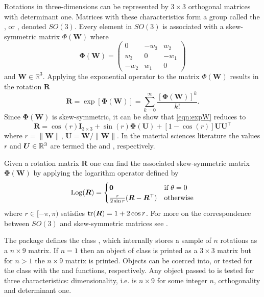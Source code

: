 Rotations in three-dimensions can be represented by $3\times3$ orthogonal matrices with determinant one.  Matrices with these characteristics form a group called the , or , denoted $SO(3)$.  Every element in $SO(3)$ is associated with a skew-symmetric matrix $\Phi(\bm W)$ where
\[
\bm{\Phi}(\bm{W}) = \left(\begin{array}{ccc}0 & -w_3 & w_2 \\ w_3 & 0 & -w_1 \\-w_2 & w_1 & 0\end{array}\right)
\]
and $\bm W\in\mathbb{R}^3$.  Applying the exponential operator to the matrix $\Phi(\bm W)$ results in the rotation $\bm R$
\begin{equation}\label{eqn:expW}
  \bm R=\exp[\bm{\Phi}(\bm{W})] = \sum\limits_{k=0}^\infty \frac{[\bm{\Phi}(\bm{W})]^k}{k!}.
  \end{equation}
Since $\bm\Phi(\bm W)$ is skew-symmetric, it can be show that \eqref{eqn:expW} reduces to
\begin{equation}\label{eqn:angleAxis}
\bm R =\cos(r)\bm{I}_{3\times3} + \sin(r) \bm{\Phi}(\bm{U}) + [1-\cos (r)] \bm{U} \bm{U}^\top
\end{equation}
where $r=\|\bm{W}\|$, $\bm{U} =\bm{W}/\|\bm{W}\|$.  In the material sciences literature the values $r$ and  $\bm U\in\mathbb{R}^3$ are termed the  and , respectively.

Given a rotation matrix $\bm R$ one can find the associated skew-symmetric matrix $\bm{\Phi}(\bm W)$ by applying the logarithm operator defined by
\begin{equation}\label{eqn:matLog}
\text{Log}(\bm R)=\begin{cases}
\bm 0 &\text{if } \theta=0\\
\frac{r}{2\sin r}(\bm R-\bm R^\top)&\text{otherwise}
\end{cases}
\end{equation}
where $r\in[-\pi,\pi)$ satisfies $\text{tr}(\bm R)=1+2\cos r$.  For more on the correspondence between $SO(3)$ and skew-symmetric matrices see \cite{stanfill2013}.

The  package defines the  class , which internally stores a sample of $n$ rotations as a $n\times9$ matrix.  If $n=1$ then an object of class  is printed as a $3\times3$ matrix but for $n>1$ the $n\times9$ matrix is printed.  Objects can be coerced into, or tested for the class  with the  and  functions, respectively.  Any object passed to  is tested for three characteristics: dimensionality, i.e. is $n\times 9$ for some integer $n$, orthogonality and determinant one.

